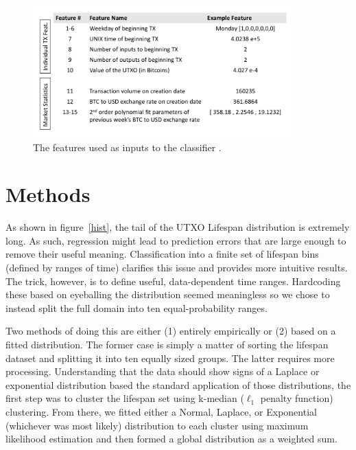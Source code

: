 \documentclass[12pt]{article}
\begin{document}
\begin{figure}
\begin{center}
\includegraphics[width=0.9\textwidth]{figures/features}
\end{center}
\caption{The features used as inputs to the classifier .}
\label{features}
\end{figure}


\section{Methods}
As shown in figure~\ref{hist}, the tail of the UTXO Lifespan distribution is extremely long. As such, regression might lead to prediction errors that are large enough to remove their useful meaning. Classification into a finite set of lifespan bins (defined by ranges of time) clarifies this issue and provides more intuitive results. The trick, however, is to define useful, data-dependent time ranges. Hardcoding these based on eyeballing the distribution seemed meaningless so we chose to instead split the full domain into ten equal-probability ranges.

Two methods of doing this are either (1) entirely empirically or (2) based on a fitted distribution. The former case is simply a matter of sorting the lifespan dataset and splitting it into ten equally sized groups. The latter requires more processing. Understanding that the data should show signs of a Laplace or exponential distribution based the standard application of those distributions, the first step was to cluster the lifespan set using k-median ($\ell_1$ penalty function) clustering. From there, we fitted either a Normal, Laplace, or Exponential (whichever was most likely) distribution to each cluster using maximum likelihood estimation and then formed a global distribution as a weighted sum. 
\end{document}
